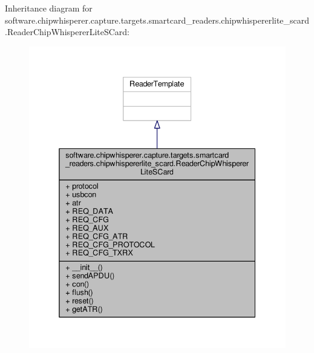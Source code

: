 Inheritance diagram for software.\+chipwhisperer.\+capture.\+targets.\+smartcard\+\_\+readers.\+chipwhispererlite\+\_\+scard.\+Reader\+Chip\+Whisperer\+Lite\+S\+Card\+:\nopagebreak
\begin{figure}[H]
\begin{center}
\leavevmode
\includegraphics[width=338pt]{dd/dd5/classsoftware_1_1chipwhisperer_1_1capture_1_1targets_1_1smartcard__readers_1_1chipwhispererlite_3e1ccd86c8e844c3c8f25b38fb09267b}
\end{center}
\end{figure}


